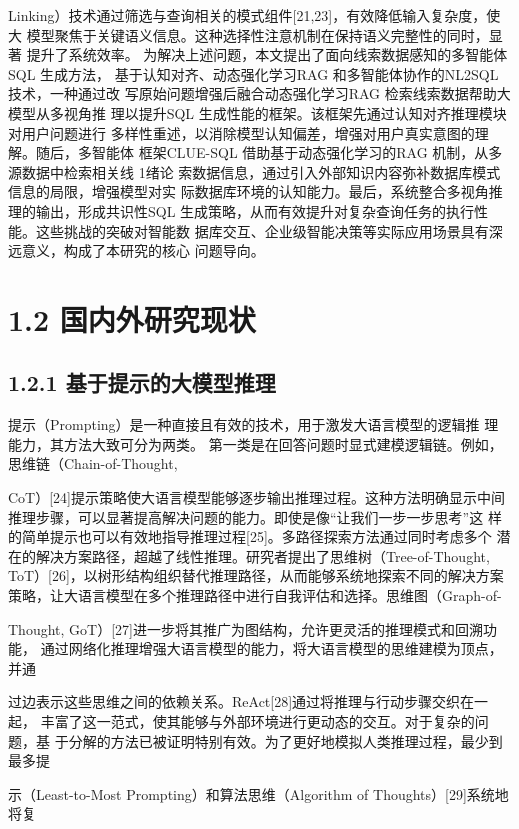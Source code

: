 \documentclass[12pt,a4paper,openright,UTF8]{ctexbook}
\begin{document}
Linking）技术通过筛选与查询相关的模式组件[21,23]，有效降低输入复杂度，使大 模型聚焦于关键语义信息。这种选择性注意机制在保持语义完整性的同时，显著 提升了系统效率。 为解决上述问题，本文提出了面向线索数据感知的多智能体SQL 生成方法， 基于认知对齐、动态强化学习RAG 和多智能体协作的NL2SQL 技术，一种通过改 写原始问题增强后融合动态强化学习RAG 检索线索数据帮助大模型从多视角推 理以提升SQL 生成性能的框架。该框架先通过认知对齐推理模块对用户问题进行 多样性重述，以消除模型认知偏差，增强对用户真实意图的理解。随后，多智能体 框架CLUE-SQL 借助基于动态强化学习的RAG 机制，从多源数据中检索相关线 1绪论 索数据信息，通过引入外部知识内容弥补数据库模式信息的局限，增强模型对实 际数据库环境的认知能力。最后，系统整合多视角推理的输出，形成共识性SQL 生成策略，从而有效提升对复杂查询任务的执行性能。这些挑战的突破对智能数 据库交互、企业级智能决策等实际应用场景具有深远意义，构成了本研究的核心 问题导向。

\section{1.2 国内外研究现状}

\subsection{1.2.1 基于提示的大模型推理}

提示（Prompting）是一种直接且有效的技术，用于激发大语言模型的逻辑推 理能力，其方法大致可分为两类。 第一类是在回答问题时显式建模逻辑链。例如，思维链（Chain-of-Thought,

CoT）[24]提示策略使大语言模型能够逐步输出推理过程。这种方法明确显示中间 推理步骤，可以显著提高解决问题的能力。即使是像“让我们一步一步思考”这 样的简单提示也可以有效地指导推理过程[25]。多路径探索方法通过同时考虑多个 潜在的解决方案路径，超越了线性推理。研究者提出了思维树（Tree-of-Thought, ToT）[26]，以树形结构组织替代推理路径，从而能够系统地探索不同的解决方案 策略，让大语言模型在多个推理路径中进行自我评估和选择。思维图（Graph-of-

Thought, GoT）[27]进一步将其推广为图结构，允许更灵活的推理模式和回溯功能， 通过网络化推理增强大语言模型的能力，将大语言模型的思维建模为顶点，并通

过边表示这些思维之间的依赖关系。ReAct[28]通过将推理与行动步骤交织在一起， 丰富了这一范式，使其能够与外部环境进行更动态的交互。对于复杂的问题，基 于分解的方法已被证明特别有效。为了更好地模拟人类推理过程，最少到最多提

示（Least-to-Most Prompting）和算法思维（Algorithm of Thoughts）[29]系统地将复
\end{document}
